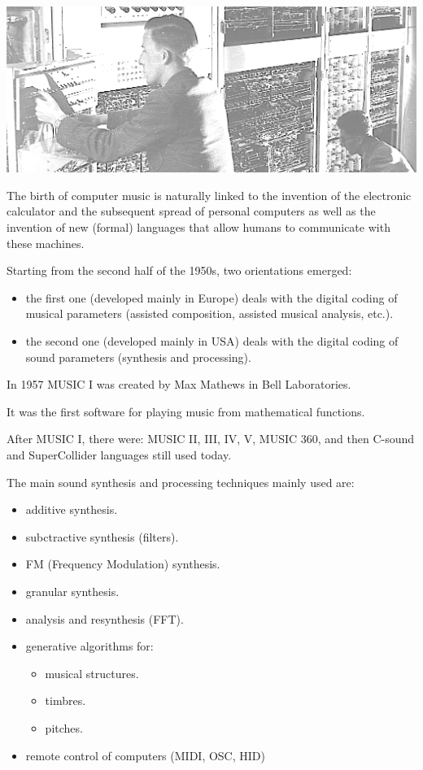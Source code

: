 \begin{center}
\includegraphics[scale=0.5]{../img/compm.png}
\end{center}

The birth of computer music is naturally linked to the invention of the electronic calculator and the subsequent spread of personal computers as well as the invention of new (formal) languages that allow humans to communicate with these machines.

Starting from the second half of the 1950s, two orientations emerged:

\begin{itemize}
\tightlist
\item the first one (developed mainly in Europe) deals with the digital coding of musical parameters (assisted composition, assisted musical analysis, etc.).
\item the second one (developed mainly in USA) deals with the digital coding of sound parameters (synthesis and processing).
\end{itemize}

In 1957 MUSIC I was created by Max Mathews in Bell Laboratories.

It was the first software for playing music from mathematical functions.

After MUSIC I, there were: MUSIC II, III, IV, V, MUSIC 360, and then C-sound and SuperCollider languages still used today.

The main sound synthesis and processing techniques mainly used are:

\begin{itemize}
\tightlist
\item additive synthesis.
\item subctractive synthesis (filters).
\item FM (Frequency Modulation) synthesis.
\item granular synthesis.
\item analysis and resynthesis (FFT).
\item generative algorithms for:

  \begin{itemize} 
  \tightlist
  \item musical structures.
  \item timbres.
  \item pitches.
  \end{itemize}
\item remote control of computers (MIDI, OSC, HID)
\end{itemize}

